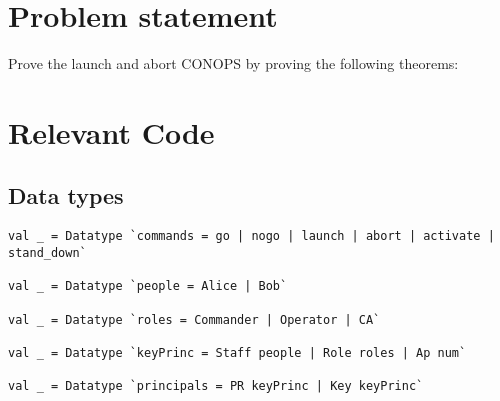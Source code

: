 \documentclass{report}
\begin{document}
\section{Problem statement}
\label{problem-statement-14}
Prove the launch and abort CONOPS by proving the
following theorems:
\begin{quote}
\HOLconopsZeroSolutionTheoremsApRuleActivateXXthm
{}\HOLconopsZeroSolutionTheoremsApRuleStandDownXXthm
{}\HOLconopsZeroSolutionTheoremsOpRuleAbortXXthm
{}\HOLconopsZeroSolutionTheoremsOpRuleLaunchXXthm
\end{quote}



\section{Relevant Code}
\label{rel-code-14}

\subsection{Data types}
\label{datatypes-14}
\begin{lstlisting}[frame=TBlr]
val _ = Datatype `commands = go | nogo | launch | abort | activate | stand_down`

val _ = Datatype `people = Alice | Bob`

val _ = Datatype `roles = Commander | Operator | CA`

val _ = Datatype `keyPrinc = Staff people | Role roles | Ap num`

val _ = Datatype `principals = PR keyPrinc | Key keyPrinc`
\end{lstlisting}
\end{document}
